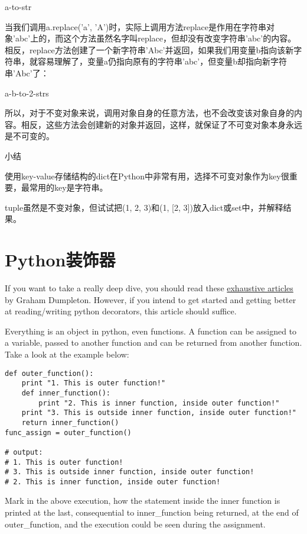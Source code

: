 a-to-str

当我们调用a.replace('a', 'A')时，实际上调用方法replace是作用在字符串对象'abc'上的，而这个方法虽然名字叫replace，但却没有改变字符串'abc'的内容。相反，replace方法创建了一个新字符串'Abc'并返回，如果我们用变量b指向该新字符串，就容易理解了，变量a仍指向原有的字符串'abc'，但变量b却指向新字符串'Abc'了：

a-b-to-2-strs

所以，对于不变对象来说，调用对象自身的任意方法，也不会改变该对象自身的内容。相反，这些方法会创建新的对象并返回，这样，就保证了不可变对象本身永远是不可变的。

小结

使用key-value存储结构的dict在Python中非常有用，选择不可变对象作为key很重要，最常用的key是字符串。

tuple虽然是不变对象，但试试把(1, 2, 3)和(1, [2, 3])放入dict或set中，并解释结果。


\section{Python装饰器}
If you want to take a really deep dive, you should read these \href{https://github.com/GrahamDumpleton/wrapt/tree/develop/blog}{exhaustive articles} by Graham Dumpleton. However, if you intend to get started and getting better at reading/writing python decorators, this article should suffice.

Everything is an object in python, even functions. A function can be assigned to a variable, passed to another function and can be returned from another function. Take a look at the example below:

\begin{verbatim}
def outer_function():
    print "1. This is outer function!"
    def inner_function():
        print "2. This is inner function, inside outer function!"
    print "3. This is outside inner function, inside outer function!"
    return inner_function()
func_assign = outer_function()

# output:
# 1. This is outer function!
# 3. This is outside inner function, inside outer function!
# 2. This is inner function, inside outer function!
\end{verbatim}

Mark in the above execution, how the statement inside the inner function is printed at the last, consequential to inner\_function being returned, at the end of outer\_function, and the execution could be seen during the assignment.

